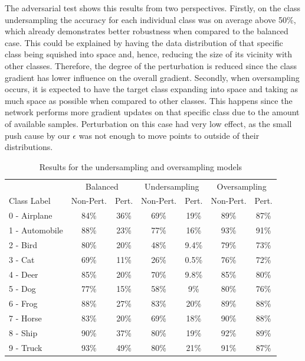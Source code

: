 The adversarial test shows this results from two perspectives. Firstly, on the class undersampling the accuracy for each individual class was on average above 50\%, which already demonstrates better robustness when compared to the balanced case. This could be explained by having the data distribution of that specific class being squished into space and, hence, reducing the size of its vicinity with other classes. Therefore, the degree of the perturbation is reduced since the class gradient has lower influence on the overall gradient. Secondly, when oversampling occurs, it is expected to have the target class expanding into space and taking as much space as possible when compared to other classes. This happens since the network performs more gradient updates on that specific class due to the amount of available samples. Perturbation on this case had very low effect, as the small push cause by our $\epsilon$ was not enough to move points to outside of their distributions.
\begin{table}[H]
	\centering
	
	\begin{tabular}{lcccccc}
		\toprule
		&\multicolumn{2}{c}{Balanced}
		&\multicolumn{2}{c}{Undersampling}
		&\multicolumn{2}{c}{Oversampling} 
		\\\cmidrule(r){2-3}\cmidrule(l){4-5}\cmidrule(l){6-7}
		Class Label &Non-Pert. &Pert. &Non-Pert. &Pert. &Non-Pert. &Pert.      \\
		\midrule
		0 - Airplane &84\%& 36\% &69\%& 19\%    & 89\% &87\%      \\
		1 - Automobile &88\%& 23\% &77\%& 16\%    & 93\% &91\%      \\
		2 - Bird &80\%& 20\% &48\%& 9.4\%    & 79\% &73\%      \\
		3 - Cat &69\%& 11\% &26\%& 0.5\%    & 76\% &72\%      \\
		4 - Deer &85\%& 20\% &70\%& 9.8\%    & 85\% &80\%      \\
		5 - Dog &77\%& 15\% &58\%& 9\%    & 80\% &76\%      \\
		6 - Frog &88\%& 27\% &83\%& 20\%    & 89\% &88\%      \\
		7 - Horse &83\%& 20\% &69\%& 18\%    & 90\% &88\%      \\
		8 - Ship &90\%& 37\% &80\%& 19\%    & 92\% &89\%      \\
		9 - Truck &93\%& 49\% &80\%& 21\%    & 91\% &87\%      \\
		\bottomrule
	\end{tabular}
	\caption{Results for the undersampling and oversampling models}
	\label{tbl:results}
\end{table}

